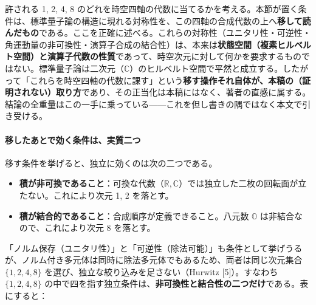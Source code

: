 \documentclass[
]{ltjsarticle}
\providecommand{\tightlist}{%
  \setlength{\itemsep}{0pt}\setlength{\parskip}{0pt}}
\begin{document}
許される 1, 2, 4, 8
のどれを時空四軸の代数に当てるかを考える。本節が置く条件は、標準量子論の構造に現れる対称性を、この四軸の合成代数の上へ\textbf{移して読んだもの}である。ここを正確に述べる。これらの対称性（ユニタリ性・可逆性・角運動量の非可換性・演算子合成の結合性）は、本来は\textbf{状態空間（複素ヒルベルト空間）と演算子代数の性質}であって、時空次元に対して何かを要求するものではない。標準量子論は二次元（\(\mathbb{C}\)）のヒルベルト空間で平然と成立する。したがって「これらを時空四軸の代数に課す」という\textbf{移す操作それ自体が、本稿の（証明されない）取り方}であり、その正当化は本稿にはなく、著者の直感に属する。結論の全重量はこの一手に乗っている------これを但し書きの隅ではなく本文で引き受ける。

\paragraph{移したあとで効く条件は、実質二つ}\label{ux79fbux3057ux305fux3042ux3068ux3067ux52b9ux304fux6761ux4ef6ux306fux5b9fux8ceaux4e8cux3064}

移す条件を挙げると、独立に効くのは次の二つである。

\begin{itemize}
\tightlist
\item
  \textbf{積が非可換であること}：可換な代数（\(\mathbb{R}, \mathbb{C}\)）では独立した二枚の回転面が立たない。これにより次元
  1, 2 を落とす。
\item
  \textbf{積が結合的であること}：合成順序が定義できること。八元数
  \(\mathbb{O}\) は非結合なので、これにより次元 8 を落とす。
\end{itemize}

「ノルム保存（ユニタリ性）」と「可逆性（除法可能）」も条件として挙げうるが、ノルム付き多元体は同時に除法多元体でもあるため、両者は同じ次元集合
\(\{1,2,4,8\}\) を選び、独立な絞り込みを足さない（Hurwitz
{[}5{]}）。すなわち \(\{1,2,4,8\}\)
の中で四を指す独立条件は、\textbf{非可換性と結合性の二つだけ}である。表にすると：
\end{document}
